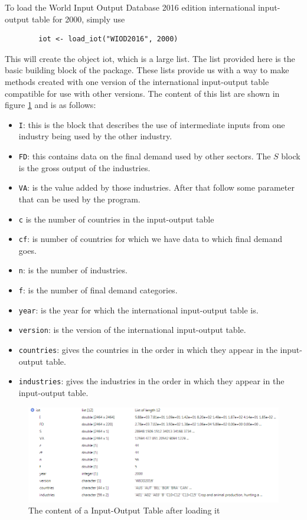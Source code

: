 \documentclass[10pt,a4paper]{paper}
\begin{document}
	To load the World Input Output Database 2016 edition international input-output table for 2000, simply use
	\begin{verbatim}
		iot <- load_iot("WIOD2016", 2000)
	\end{verbatim}
	This will create the object iot, which is a large list. The list provided here is the basic building block of the package. These lists provide us with a way to make methods created with one version of the international input-output table compatible for use with other versions. The content of this list are shown in figure \ref{fig:contentiot} and is as follows:
	\begin{itemize}
		\item \texttt{I}: this is the block that describes the use of intermediate inputs from one industry being used by the other industry.
		\item \texttt{FD}: this contains data on the final demand used by other sectors. The $S$ block is the gross output of the industries.
		\item \texttt{VA}: is the value added by those industries. After that follow some parameter that can be used by the program.
		\item \texttt{c} is the number of countries in the input-output table
		\item \texttt{cf}: is number of countries for which we have data to which final demand goes.
		\item \texttt{n}: is the number of industries. 
		\item \texttt{f}: is the number of final demand categories. 
		\item \texttt{year}: is the year for which the international input-output table is.
		\item \texttt{version}: is the version of the international input-output table.
		\item \texttt{countries}: gives the countries in the order in which they appear in the input-output table.
		\item \texttt{industries}: gives the industries in the order in which they appear in the input-output table.
	\end{itemize}
	
	\begin{figure}[t]
	\centering
	\includegraphics[width=\linewidth]{content_iot}
	\caption{The content of a Input-Output Table after loading it}
	\label{fig:contentiot}
	\end{figure}
\end{document}
